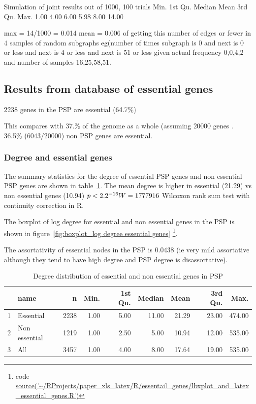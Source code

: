 Simulation of joint results out of 1000, 100 trials
Min. 1st Qu.  Median    Mean 3rd Qu.    Max. 
   1.00    4.00    6.00    5.98    8.00   14.00 
   
   max = 14/1000 = 0.014
   mean = 0.006 of getting this number of edges or fewer in 4 samples of random subgraphs eg(number of times subgraph is 0 and next is 0 or less and next is 4 or less and next is 51 or less given actual frequency 0,0,4,2 and number of samples 16,25,58,51.
   
 


 
 
 \subsection{Results from database of essential genes}

2238 genes in the PSP are essential (64.7\%)

This compares with 37.\% of the genome as a whole (assuming 20000 genes . 36.5\% (6043/20000) non PSP genes are essential. 

\subsubsection{Degree and essential genes}

The summary statistics for the degree of essential PSP genes and non essential PSP genes are shown in table~\ref{tab:degree distribution essential and non essential genes PSP}. The mean degree is higher in essential (21.29) vs non essential genes (10.94) $p<2.2 \time 10^{-16}   W=1777916$ Wilcoxon rank sum test with continuity correction in R.

The boxplot of log degree for essential and non essential genes in the PSP is shown in figure~\ref{fig:boxplot_log degree essential genes}
\footnote{code \url{source('~/RProjects/paper_xls_latex/R/essentail_genes/lbxplot_and_latex_essential_genes.R')}}.

The assortativity of essential nodes in the PSP is 0.0438 (ie very mild assortative although they tend to have high degree and PSP degree is disassortative).


\begin{table}[ht]
\centering
\begin{tabular}{rlrrrrrrr}
  \hline
 & name & n & Min. & 1st Qu. & Median & Mean & 3rd Qu. & Max. \\ 
  \hline
1 & Essential & 2238 & 1.00 & 5.00 & 11.00 & 21.29 & 23.00 & 474.00 \\ 
  2 & Non essential & 1219 & 1.00 & 2.50 & 5.00 & 10.94 & 12.00 & 535.00 \\ 
  3 & All & 3457 & 1.00 & 4.00 & 8.00 & 17.64 & 19.00 & 535.00 \\ 
   \hline
\end{tabular}
\caption{Degree distribution of essential and non essential genes in PSP}
\label{tab:degree distribution essential and non essential genes PSP}
\end{table}

